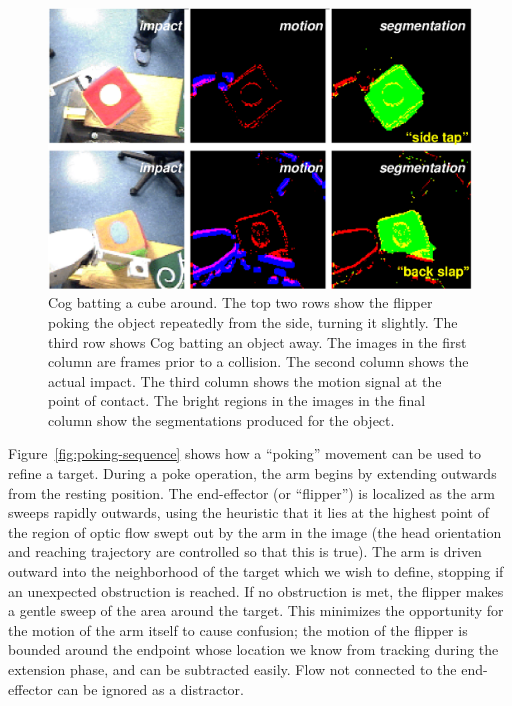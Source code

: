 \ifverbose
%
\begin{figure}[tb]
\begin{center}
\includegraphics[width=12cm]{segmentation-detail.eps}
\caption{ 
\label{fig:poking-segmentation}
%
Cog batting a cube around.  The top two rows show the flipper poking
the object repeatedly from the side, turning it slightly.  The third
row shows Cog batting an object away.  The images in the first column
are frames prior to a collision.  The second column shows the actual
impact.  The third column shows the motion signal at the point of
contact.  The bright regions in the images in the final column show
the segmentations produced for the object. 
%
}
\end{center}
\end{figure}
%
\fi

Figure~\ref{fig:poking-sequence} shows how a ``poking'' movement can
be used to refine a target.  During a poke operation, the arm begins
by extending outwards from the resting position.  The end-effector (or
``flipper'') is localized as the arm sweeps rapidly outwards, using
the heuristic that it lies at the highest point of the region of optic
flow swept out by the arm in the image (the head orientation and
reaching trajectory are controlled so that this is true).  The arm is
driven outward into the neighborhood of the target which we wish to
define, stopping if an unexpected obstruction is reached.  If no
obstruction is met, the flipper makes a gentle sweep of the area
around the target.  This minimizes the opportunity for the motion of
the arm itself to cause confusion; the motion of the flipper is
bounded around the endpoint whose location we know from tracking
during the extension phase, and can be subtracted easily.  Flow not
connected to the end-effector can be ignored as a distractor.  


